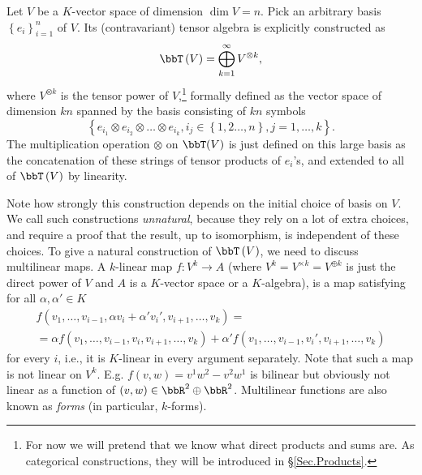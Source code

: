 \begin{example}\label{Tensor algebra}
Let $V$ be a $K$-vector space of dimension $\dim V=n$. Pick an
arbitrary basis $\left\{ e_{i}\right\} _{i=1}^{n}$ of $V$. Its (contravariant)
tensor algebra is explicitly constructed as 
\begin{equation}
\bbT\left(V\right)=\bigoplus_{k=1}^{\infty}V^{\otimes k},\label{eq: tensor alg}
\end{equation}
where $V^{\otimes k}$ is the tensor power of $V$,\footnote{For now we will pretend that we know what direct products and sums are. As categorical constructions, they will be introduced in \S\ref{Sec.Products}.} formally defined
as the vector space of dimension $kn$ spanned by the basis consisting
of $kn$ symbols \[\left\{ e_{i_{1}}\otimes e_{i_{2}}\otimes\ldots\otimes e_{i_{k}},i_{j}\in\left\{ 1,2\ldots,n\right\} ,j=1,\ldots,k\right\}.\]
The multiplication operation $\otimes$ on $\bbT(V)$ is just defined
on this large basis as the concatenation of these strings of tensor products
of $e_{i}$'s, and extended to all of $\bbT\left(V\right)$ by linearity.

Note how strongly this construction depends on the initial choice
of basis on $V$. We call such constructions \emph{unnatural}, because
they rely on a lot of extra choices, and require a proof that the
result, up to isomorphism, is independent of these choices. To give
a natural construction of $\bbT\left(V\right)$, we need to discuss multilinear
maps. A $k$-linear map $f:V^{k}\to A$ (where $V^k=V^{\times k}=V^{\oplus k}$ is just the direct power of $V$ and $A$ is a $K$-vector space or a $K$-algebra),
is a map satisfying for all $\alpha,\alpha'\in K$
\begin{multline}
    f\left(v_{1},\ldots,v_{i-1},\alpha v_{i}+\alpha'v_{i}',v_{i+1},\ldots,v_{k}\right)=\\=\alpha f\left(v_{1},\ldots,v_{i-1},v_{i},v_{i+1},\ldots,v_{k}\right)+\alpha'f\left(v_{1},\ldots,v_{i-1},v_{i}',v_{i+1},\ldots,v_{k}\right)
\end{multline}
for every $i$, i.e., it is $K$-linear in every argument separately.
Note that such a map is not linear on $V^{k}$. E.g. $f\left(v,w\right)=v^1w^2-v^2w^1$ is bilinear but obviously not linear as a function of $(v,w)\in \bbR^{2}\oplus \bbR^2$. Multilinear functions are also known as \emph{forms} (in particular, $k$-forms).


\end{example}
